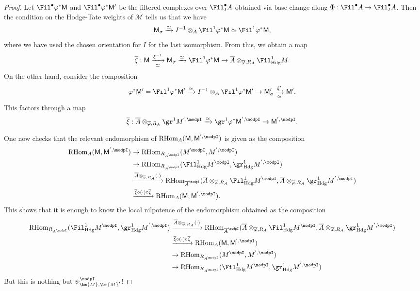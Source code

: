 \documentclass[10pt]{amsart}
\begin{document}
\begin{proof}
Let $\Fil^\bullet \varphi^*\mathsf{M}$ and $\Fil^\bullet\varphi^*\mathsf{M}'$ be the filtered complexes over $\Fil^\bullet_IA$ obtained via base-change along $\Phi:\Fil^\bullet A\to \Fil^\bullet_IA$. Then the condition on the Hodge-Tate weights of $\mathcal{M}$ tells us that we have
\[
\mathsf{M}_\sigma \xrightarrow{\simeq}I^{-1}\otimes_A\Fil^1\varphi^*\mathsf{M}\simeq \Fil^1\varphi^*\mathsf{M}, 
\]
where we have used the chosen orientation for $I$ for the last isomorphism. From this, we obtain a map
\[
\overline{\zeta}:\mathsf{M}\xrightarrow[\simeq]{\xi^{-1}}\mathsf{M}_\sigma\xrightarrow{\simeq}\Fil^1\varphi^*\mathsf{M}\to \overline{A}\otimes_{\overline{\varphi},R_A}\Fil^1_{\mathrm{Hdg}}M.
\]
On the other hand, consider the composition
\[
\varphi^*\mathsf{M}'= \Fil^1\varphi^*\mathsf{M}'\xrightarrow{\simeq}I^{-1}\otimes_A\Fil^1\varphi^*\mathsf{M}'\to \mathsf{M}'_\sigma\xrightarrow[\simeq]{\xi'}\mathsf{M}'.
\]
This factors through a map
\[
\overline{\xi}:\overline{A}\otimes_{\overline\varphi,R_A}\gr^{1}M^{',\modpI}\xrightarrow{\simeq}\gr^1\varphi^*\mathsf{M}^{',\modpI}\to \mathsf{M}^{',\modpI}.
\]

One now checks that the relevant endomorphism of $\mathrm{RHom}_{A}(\mathsf{M},\mathsf{M}^{',\modpI})$ is given as the composition
\begin{align*}
   \mathrm{RHom}_{A}(\mathsf{M},\mathsf{M}^{',\modpI})&\to \mathrm{RHom}_{R_{A^\modpI}}(M^\modpI,M^{',\modpI})\\
   &\to \mathrm{RHom}_{R_{A^\modpI}}(\Fil^1_{\mathrm{Hdg}}M^\modpI,\gr^1_{\mathrm{Hdg}}M^{',\modpI})\\
   &\xrightarrow{\overline{A}\otimes_{\overline\varphi,R_A}(\cdot)}\mathrm{RHom}_{\overline{A}^\modpI}(\overline{A}\otimes_{\overline\varphi,R_A}\Fil^1_{\mathrm{Hdg}}M^\modpI,\overline{A}\otimes_{\overline\varphi,R_A}\gr^1_{\mathrm{Hdg}}M^{',\modpI})\\
   &\xrightarrow{\overline\xi\circ(\cdot)\circ\overline{\zeta}} \mathrm{RHom}_{A}(\mathsf{M},\mathsf{M}^{',\modpI}).
\end{align*}
This shows that it is enough to know the local nilpotence of the endomorphism obtained as the composition
\begin{align*}
 \mathrm{RHom}_{R_{A^\modpI}}(\Fil^1_{\mathrm{Hdg}}M^\modpI,\gr^1_{\mathrm{Hdg}}M^{',\modpI})&\xrightarrow{\overline{A}\otimes_{\overline\varphi,R_A}(\cdot)}\mathrm{RHom}_{\overline{A}^\modpI}(\overline{A}\otimes_{\overline\varphi,R_A}\Fil^1_{\mathrm{Hdg}}M^\modpI,\overline{A}\otimes_{\overline\varphi,R_A}\gr^1_{\mathrm{Hdg}}M^{',\modpI})\\
   &\xrightarrow{\overline\xi\circ(\cdot)\circ\overline{\zeta}} \mathrm{RHom}_{A}(\mathsf{M},\mathsf{M}^{',\modpI})\\
   &\to \mathrm{RHom}_{R_{A^\modpI}}(M^\modpI,M^{',\modpI})\\
    &\to \mathrm{RHom}_{R_{A^\modpI}}(\Fil^1_{\mathrm{Hdg}}M^\modpI,\gr^1_{\mathrm{Hdg}}M^{',\modpI})
\end{align*}
But this is nothing but $\psi^\modpI_{\bm{M},\bm{M}'}$!
\end{proof}
\end{document}
